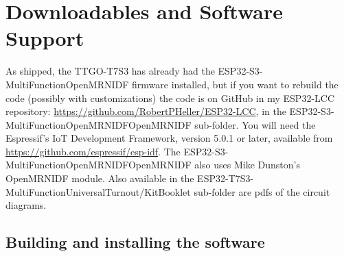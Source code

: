 %
%
%
%
% 
%
%
%
%
%
% 
%

\section{Downloadables and Software Support}

As shipped, the TTGO-T7S3 has already had the ESP32-S3-MultiFunctionOpenMRNIDF
firmware installed, but if you want to rebuild the code (possibly with
customizations) the code is on GitHub in my ESP32-LCC repository:
\url{https://github.com/RobertPHeller/ESP32-LCC}, in the
ESP32-S3-MultiFunctionOpenMRNIDFOpenMRNIDF sub-folder. You will need the
Espressif's IoT Development Framework, version 5.0.1 or later, available from
\url{https://github.com/espressif/esp-idf}. The
ESP32-S3-MultiFunctionOpenMRNIDFOpenMRNIDF also uses Mike Dunston's OpenMRNIDF
module. Also available in the 
ESP32-T7S3-MultiFunctionUniversalTurnout/KitBooklet sub-folder are pdfs of the 
circuit diagrams.

\subsection{Building and installing the software}

